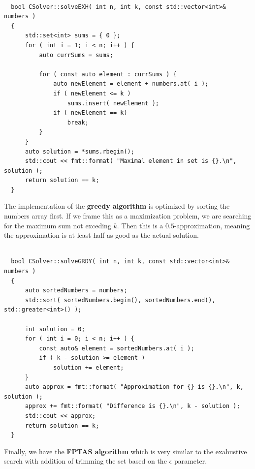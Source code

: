 \documentclass[11pt]{article}
\begin{document}
\begin{verbatim}

  bool CSolver::solveEXH( int n, int k, const std::vector<int>& numbers )
  {
      std::set<int> sums = { 0 };
      for ( int i = 1; i < n; i++ ) {
          auto currSums = sums;
  
          for ( const auto element : currSums ) {
              auto newElement = element + numbers.at( i );
              if ( newElement <= k )
                  sums.insert( newElement );
              if ( newElement == k)
                  break;
          }
      }
      auto solution = *sums.rbegin();
      std::cout << fmt::format( "Maximal element in set is {}.\n", solution );
      return solution == k;
  } 
\end{verbatim}

\pagebreak
The implementation of the \textbf{greedy algorithm} is optimized by sorting the numbers array first. If we frame this as a maximization problem, we are searching for the maximum sum not exceding $k$. Then this is a $0.5$-approximation, meaning the approximation is at least half as good as the actual solution.

\begin{verbatim}

  bool CSolver::solveGRDY( int n, int k, const std::vector<int>& numbers )
  {
      auto sortedNumbers = numbers;
      std::sort( sortedNumbers.begin(), sortedNumbers.end(), std::greater<int>() );
  
      int solution = 0;
      for ( int i = 0; i < n; i++ ) {
          const auto& element = sortedNumbers.at( i );
          if ( k - solution >= element )
              solution += element;
      }
      auto approx = fmt::format( "Approximation for {} is {}.\n", k, solution );
      approx += fmt::format( "Difference is {}.\n", k - solution );
      std::cout << approx;
      return solution == k;
  }  
\end{verbatim}

Finally, we have the \textbf{FPTAS algorithm} which is very similar to the exahustive search with addition of trimming the set based on the $\epsilon$ parameter.
\end{document}
